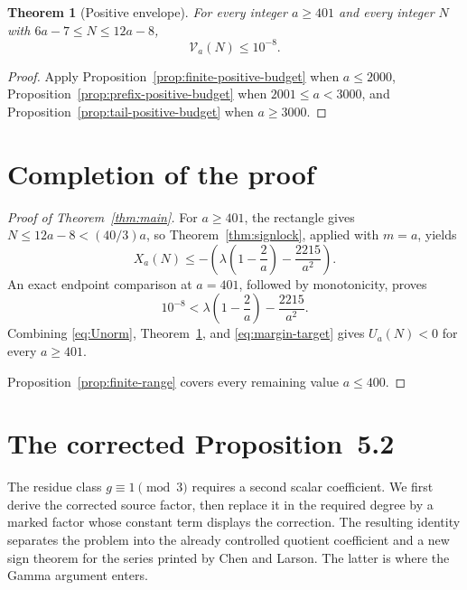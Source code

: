 \documentclass[11pt]{article}
\newtheorem{theorem}{Theorem}[section]
\theoremstyle{definition}
\theoremstyle{remark}
\begin{document}
\begin{theorem}[Positive envelope]\label{thm:positive-envelope}
For every integer $a\ge401$ and every integer $N$ with
$6a-7\le N\le12a-8$,
\begin{equation}\label{eq:envelope-result}
  \mathcal V_a(N)\le10^{-8}.
\end{equation}
\end{theorem}

\begin{proof}
Apply Proposition~\ref{prop:finite-positive-budget} when $a\le2000$,
Proposition~\ref{prop:prefix-positive-budget} when $2001\le a<3000$, and
Proposition~\ref{prop:tail-positive-budget} when $a\ge3000$.
\end{proof}

\section{Completion of the proof}\label{sec:completion}

\begin{proof}[Proof of Theorem~\ref{thm:main}]
For $a\ge401$, the rectangle gives $N\le12a-8<(40/3)a$, so
Theorem~\ref{thm:signlock}, applied with $m=a$, yields
\begin{equation}\label{eq:Xa-margin}
 X_a(N)\le-
 \left(\lambda\left(1-\frac2a\right)-\frac{2215}{a^2}\right).
\end{equation}
An exact endpoint comparison at $a=401$, followed by monotonicity, proves
\begin{equation}\label{eq:margin-target}
  10^{-8}<\lambda\left(1-\frac2a\right)-\frac{2215}{a^2}.
\end{equation}
Combining \eqref{eq:Unorm}, Theorem~\ref{thm:positive-envelope}, and
\eqref{eq:margin-target} gives $U_a(N)<0$ for every $a\ge401$.

Proposition~\ref{prop:finite-range} covers every remaining value $a\le400$.
\end{proof}

\section{The corrected Proposition~5.2}\label{sec:prop52}

The residue class $g\equiv1\pmod3$ requires a second scalar coefficient.  We
first derive the corrected source factor, then replace it in the required
degree by a marked factor whose constant term displays the correction.  The
resulting identity separates the problem into the already controlled quotient
coefficient and a new sign theorem for the series printed by Chen and Larson.
The latter is where the Gamma argument enters.
\end{document}
